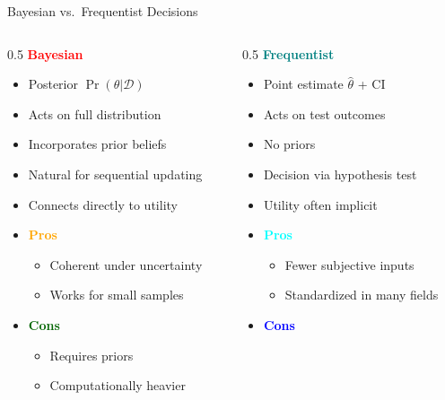 \documentclass[
  10pt,
  ignorenonframetext,
]{beamer}
\providecommand{\tightlist}{%
  \setlength{\itemsep}{0pt}\setlength{\parskip}{0pt}}
\begin{document}
\begin{frame}{Bayesian vs.~Frequentist Decisions}
\label{bayesian-vs.-frequentist-decisions}
\begin{columns}[T]
\begin{column}{0.5\textwidth}
\textbf{\textcolor{red}{Bayesian}}

\begin{itemize}
\item
  Posterior \(\Pr(\theta | \mathcal{D})\)
\item
  Acts on full distribution
\item
  Incorporates prior beliefs
\item
  Natural for sequential updating
\item
  Connects directly to utility
\item
  \textbf{\textcolor{orange}{Pros}}

  \begin{itemize}
  \tightlist
  \item
    Coherent under uncertainty
  \item
    Works for small samples
  \end{itemize}
\item
  \textbf{\textcolor{darkgreen}{Cons}}

  \begin{itemize}
  \tightlist
  \item
    Requires priors
  \item
    Computationally heavier
  \end{itemize}
\end{itemize}
\end{column}

\begin{column}{0.5\textwidth}
\textbf{\textcolor{teal}{Frequentist}}

\begin{itemize}
\item
  Point estimate \(\hat{\theta}\) + CI
\item
  Acts on test outcomes
\item
  No priors
\item
  Decision via hypothesis test
\item
  Utility often implicit
\item
  \textbf{\textcolor{cyan}{Pros}}

  \begin{itemize}
  \tightlist
  \item
    Fewer subjective inputs
  \item
    Standardized in many fields
  \end{itemize}
\item
  \textbf{\textcolor{blue}{Cons}}


\end{itemize}
\end{column}
\end{columns}
\end{frame}
\end{document}
